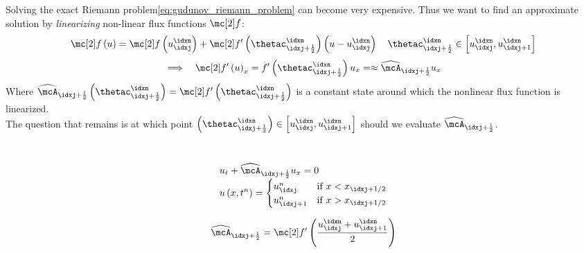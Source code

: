 \begin{sectionbox}\nospacing
    Solving the exact Riemann problem\cref{eq:gudunov_riemann_problem} can become very expensive.
    Thus we want to find an approximate solution by \textit{linearizing} non-linear flux functions $\flux$:
    \begin{align*}
      \flux \left(u\right)=\flux \left(u_{\idxj}^{\idxn}\right)+\flux' \left(\thetac^{\idxn}_{\idxj+\frac{1}{2}}\right)\left(u-u_{\idxj}^{\idxn}\right)
      \quad\thetac^{\idxn}_{\idxj+\frac{1}{2}}\in \left[u_{\idxj}^{\idxn},u_{\idxj+1}^{\idxn}\right]
    \end{align*}
    \begin{align}
      \implies&&\flux' \left(u\right)_{x}=f' \left(\thetac^{\idxn}_{\idxj+\frac{1}{2}}\right)u_{x}=\approx\widehat{\mcA}_{\idxj+\frac{1}{2}}u_{x}
    \end{align}
    Where $\widehat{\mcA}_{\idxj+\frac{1}{2}}\left(\thetac^{\idxn}_{\idxj+\frac{1}{2}}\right)=\flux'\left(\thetac^{\idxn}_{\idxj+\frac{1}{2}}\right)$ is a constant state around which the nonlinear flux function is linearized.\\
    The question that remains is at which point $\left(\thetac^{\idxn}_{\idxj+\frac{1}{2}}\right)\in \left[u_{\idxj}^{\idxn},u_{\idxj+1}^{\idxn}\right]$ should we evaluate
    $\widehat{\mcA}_{\idxj+\frac{1}{2}}$.
\end{sectionbox}
\begin{defnbox}\nospacing
    \begin{defn}\label{defn:approximate_riemann_problem}\leavevmode\\
        \begin{align}
          &u_{t}+\widehat{\mcA}_{\idxj+\frac{1}{2}}u_{x}=0 \\[-1\jot]
          &u\left(x,t^{n}\right)=
          \begin{cases}
              u_{\idxj}^{n}&\text{if }x<x_{\idxj+1/2}\\
              u_{\idxj+1}^{n}&\text{if }x>x_{\idxj+1/2}\\
          \end{cases}\label{eq:approximate_riemann_problem}
        \end{align}
    \end{defn}
\end{defnbox}
\begin{defnbox}\nospacing
    \begin{defn}\label{defn:arithmetic_average_flux}
        \begin{align}
          \widehat{\mcA}_{\idxj+\frac{1}{2}}=\flux' \left(\frac{u_{\idxj}^{\idxn}+u_{\idxj+1}^{\idxn}}{2}\right)
        \end{align}
    \end{defn}
\end{defnbox}

